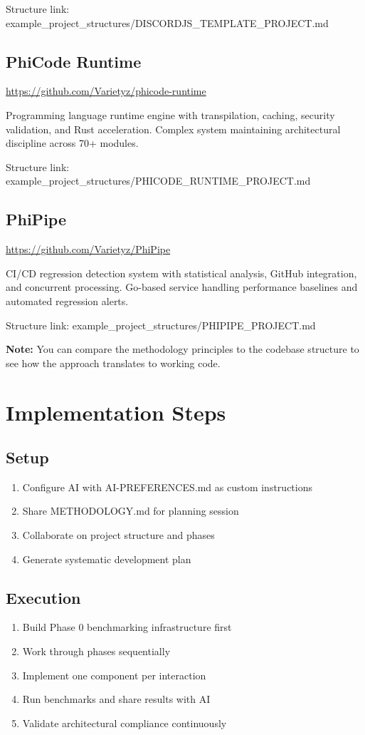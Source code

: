 \documentclass{article}
\begin{document}
Structure link: example\_project\_structures/DISCORDJS\_TEMPLATE\_PROJECT.md

\subsection{PhiCode Runtime}
\url{https://github.com/Varietyz/phicode-runtime}

Programming language runtime engine with transpilation, caching, security validation, and Rust acceleration. Complex system maintaining architectural discipline across 70+ modules.

Structure link: example\_project\_structures/PHICODE\_RUNTIME\_PROJECT.md

\subsection{PhiPipe}
\url{https://github.com/Varietyz/PhiPipe}

CI/CD regression detection system with statistical analysis, GitHub integration, and concurrent processing. Go-based service handling performance baselines and automated regression alerts.

Structure link: example\_project\_structures/PHIPIPE\_PROJECT.md

\textbf{Note:} You can compare the methodology principles to the codebase structure to see how the approach translates to working code.

\section{Implementation Steps}

\subsection{Setup}
\begin{enumerate}[noitemsep]
\item Configure AI with AI-PREFERENCES.md as custom instructions
\item Share METHODOLOGY.md for planning session
\item Collaborate on project structure and phases
\item Generate systematic development plan
\end{enumerate}

\subsection{Execution}
\begin{enumerate}[noitemsep]
\item Build Phase 0 benchmarking infrastructure first
\item Work through phases sequentially
\item Implement one component per interaction
\item Run benchmarks and share results with AI
\item Validate architectural compliance continuously
\end{enumerate}
\end{document}
